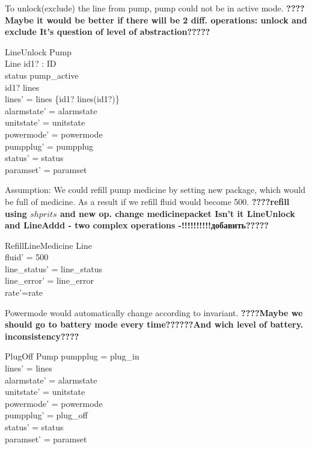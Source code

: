 \documentclass{article}
\begin{document}
	
To unlock(exclude) the line from pump, pump could not be in active mode.
\textbf{????Maybe it would be better if there will be 2 diff. operations: unlock and exclude It's question of level of abstraction?????}
	\begin{schema}{LineUnlock}
		\Delta Pump \\
		\Delta Line
		id1? : ID \\
	\where
		 status \neq pump\_active \\
		id1? \in \dom lines \\
		lines' = lines \setminus \{id1? \mapsto lines(id1?)\} \\
    	alarmstate' = alarmstate \\
    	unitstate' = unitstate \\
    	powermode' = powermode \\
    	pumpplug' = pumpplug \\
    	status' = status \\
    	paramset' = paramset
	\end{schema}
	

Assumption: We could refill pump medicine by setting new package, which would be full of medicine. As a result if we refill fluid would become 500.
\textbf{????refill using $shprits$ and new op. change medicinepacket Isn't it LineUnlock and LineAddd - two complex operations -!!!!!!!!!!добавить?????}

	\begin{schema}{RefillLineMedicine}
		\Delta Line \\
	\where
	    fluid' = 500 \\
	    line\_status' = line\_status \\
		line\_error' = line\_error \\
		rate'=rate
	\end{schema}
	
	

	Powermode would automatically change according to invariant.
		\textbf{????Maybe we should go to battery mode every time??????And wich level of battery. inconsistency????}
		
	\begin{schema}{PlugOff}
		\Delta Pump		
	\where
		pumpplug = plug\_in \\		
		lines' = lines  \\
    	alarmstate' = alarmstate \\
    	unitstate' = unitstate \\
    	powermode' = powermode \\
    	pumpplug' = plug\_off \\
    	status' = status \\		
		paramset' = paramset		
	\end{schema}
	
\end{document}
